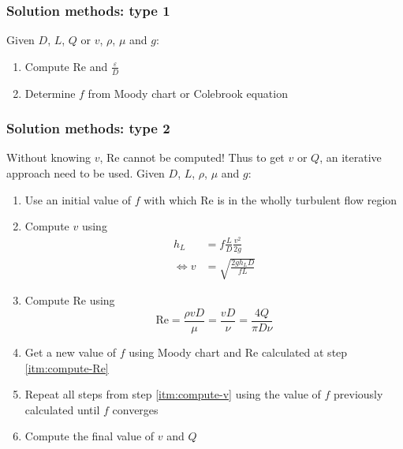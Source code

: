 \documentclass[10pt, twocolumn]{article}
\begin{document}
\subsubsection{Solution methods: type 1}
Given \(D\), \(L\), \(Q\) or \(v\), \(\rho\), \(\mu\) and \(g\):
\begin{enumerate}
  \item Compute Re and \(\frac{\varepsilon}{D}\)
  \item Determine \(f\) from Moody chart or Colebrook equation
\end{enumerate}


\subsubsection{Solution methods: type 2}
Without knowing \(v\), Re cannot be computed!
Thus to get \(v\) or \(Q\), an iterative approach need to be used.
Given \(D\), \(L\), \(\rho\), \(\mu\) and \(g\):
\begin{enumerate}
  \item Use an initial value of \(f\) with which Re is in the wholly turbulent flow region
  \item \label{itm:compute-v} Compute \(v\) using
        \begin{align*}
          h_L    & = f \frac{L}{D} \frac{v^2}{2g} \\
          \iff v & = \sqrt{\frac{2 g h_L D}{f L}}
        \end{align*}
  \item \label{itm:compute-Re} Compute Re using
        \[
          \mathrm{Re} = \frac{\rho v D}{\mu} = \frac{v D}{\nu} = \frac{4 Q}{\pi D \nu}
        \]
  \item Get a new value of \(f\) using Moody chart and Re calculated at step \ref{itm:compute-Re}
  \item Repeat all steps from step \ref{itm:compute-v} using the value of \(f\) previously calculated until \(f\) converges
  \item Compute the final value of \(v\) and \(Q\)
\end{enumerate}
\end{document}
